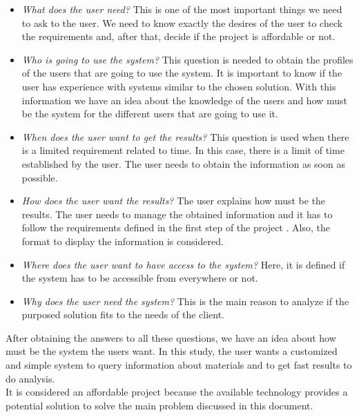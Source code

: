 \begin{itemize}

\item \textit{What does the user need?} This is one of the most important things we need to ask to the user. We need to know exactly the desires of the user to check the requirements and, after that, decide if the project is affordable or not.

\item \textit{Who is going to use the system?} This question is needed to obtain the profiles of the users that are going to use the system. It is important to know if the user has experience with systems similar to the chosen solution. With this information we have an idea about the knowledge of the users and how must be the system for the different users that are going to use it.

\item \textit{When does the user want to get the results?} This question is used when there is a limited requirement related to time. In this case, there is a limit of time established by the user. The user needs to obtain the information as soon as possible.

\item \textit{How does the user want the results?} The user explains how must be the results. The user needs to manage the obtained information and it has to follow the requirements defined in the first step of the project . Also, the format to display the information is considered.

\item \textit{Where does the user want to have access to the system?} Here, it is defined if the system has to be accessible from everywhere or not.

\item \textit{Why does the user need the system?} This is the main reason to analyze if the purposed solution fits to the needs of the client.

\end{itemize}

After obtaining the answers to all these questions, we have an idea about how must be the system the users want. In this study, the user wants a customized and simple system to query information about materials and to get fast results to do analysis.\\

It is considered an affordable project because the available technology provides a potential solution to solve the main problem discussed in this document.

